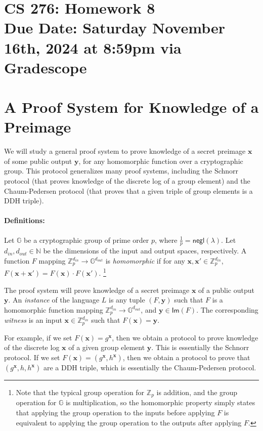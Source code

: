 \documentclass[11pt]{article}
\numberwithin{equation}{section}
\newcommand{\bfx}{\mathbf{x}}
\newcommand{\bfy}{\mathbf{y}}
\newcommand{\bbG}{\mathbb{G}}
\newcommand{\bbN}{\mathbb{N}}
\newcommand{\bbZ}{\mathbb{Z}}
\newcommand{\secp}{\lambda}
\newcommand{\negl}{\mathsf{negl}}
\newcommand{\duedate}{Saturday November 16th, 2024 at 8:59pm via Gradescope}
\begin{document}
\section*{CS 276: Homework 8\\ {\small Due Date: \duedate} }

\section{A Proof System for Knowledge of a Preimage}
We will study a general proof system to prove knowledge of a secret preimage $\bfx$ of some public output $\bfy$, for any homomorphic function over a cryptographic group. This protocol generalizes many proof systems, including the Schnorr protocol (that proves knowledge of the discrete log of a group element) and the Chaum-Pedersen protocol (that proves that a given triple of group elements is a DDH triple).

\paragraph{Definitions:} Let $\bbG$ be a cryptographic group of prime order $p$, where $\frac{1}{p} = \negl(\secp)$. Let $d_{in}, d_{out} \in \bbN$ be the dimensions of the input and output spaces, respectively. A function $F$ mapping $\bbZ_p^{d_{in}} \to \bbG^{d_{out}}$ is \textit{homomorphic} if for any $\bfx, \bfx' \in \bbZ_p^{d_{in}}$, $F(\bfx + \bfx') = F(\bfx) \cdot F(\bfx')$. \footnote{Note that the typical group operation for $\bbZ_p$ is addition, and the group operation for $\bbG$ is multiplication, so the homomorphic property simply states that applying the group operation to the inputs before applying $F$ is equivalent to applying the group operation to the outputs after applying $F$.}

The proof system will prove knowledge of a secret preimage $\bfx$ of a public output $\bfy$. An \textit{instance} of the language $L$ is any tuple $(F, \bfy)$ such that $F$ is a homomorphic function mapping $\bbZ_p^{d_{in}} \to \bbG^{d_{out}}$, and $\bfy \in \mathsf{Im}(F)$. The corresponding \textit{witness} is an input $\bfx \in \bbZ_p^{d_{in}}$ such that $F(\bfx) = \bfy$.

For example, if we set $F(\bfx) = g^\bfx$, then we obtain a protocol to prove knowledge of the discrete log $\bfx$ of a given group element $\bfy$. This is essentially the Schnorr protocol. If we set $F(\bfx) = (g^\bfx, h^\bfx)$, then we obtain a protocol to prove that $(g^\bfx, h, h^\bfx)$ are a DDH triple, which is essentially the Chaum-Pedersen protocol.
\end{document}

